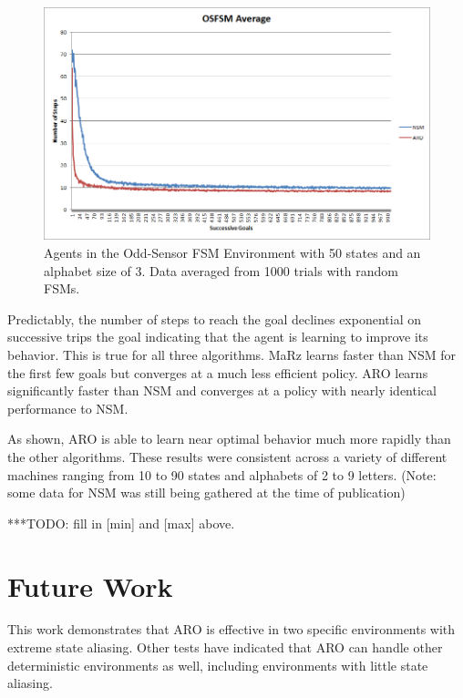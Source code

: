\documentclass[letterpaper]{article} %
\begin{document}
\begin{figure}[t]
	\centering
	\includegraphics[width=0.9\columnwidth]{OSFSMGraph.png} %
	\caption{Agents in the Odd-Sensor FSM Environment with 50 states and an alphabet size of 3. Data averaged from 1000 trials with random FSMs.}
	\label{fig5}
\end{figure}

Predictably, the number of steps to reach the goal declines
exponential on successive trips the goal indicating that the agent is
learning to improve its behavior.  This is true for all three
algorithms. MaRz learns faster than NSM for the first few goals but converges at a much less efficient policy.
ARO learns significantly faster than NSM and converges at a policy with nearly identical performance to NSM.

As shown, ARO is able to learn near optimal behavior much more rapidly
than the other algorithms.  These results were consistent across a
variety of different machines ranging from 10 to 90 states and
alphabets of 2 to 9 letters. (Note: some data for NSM was still being gathered at the time of publication)

***TODO:  fill in [min] and [max] above.

\section{Future Work}

This work demonstrates that ARO is effective in two specific
environments with extreme state aliasing. Other tests have indicated that ARO can handle other deterministic environments as well, including environments with little state aliasing.
\end{document}
